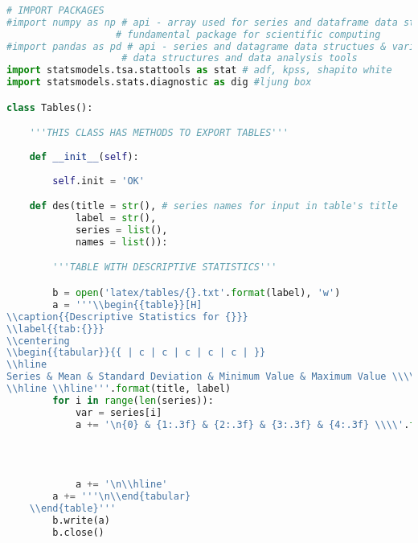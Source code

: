 \begin{lstlisting}[language=Python]



# IMPORT PACKAGES
#import numpy as np # api - array used for series and dataframe data structures
                   # fundamental package for scientific computing
#import pandas as pd # api - series and datagrame data structues & various 
                    # data structures and data analysis tools
import statsmodels.tsa.stattools as stat # adf, kpss, shapito white
import statsmodels.stats.diagnostic as dig #ljung box

class Tables():

    '''THIS CLASS HAS METHODS TO EXPORT TABLES'''
    
    def __init__(self):
        
        self.init = 'OK'

    def des(title = str(), # series names for input in table's title
            label = str(),
            series = list(),
            names = list()):

        '''TABLE WITH DESCRIPTIVE STATISTICS'''

        b = open('latex/tables/{}.txt'.format(label), 'w')
        a = '''\\begin{{table}}[H]
\\caption{{Descriptive Statistics for {}}}
\\label{{tab:{}}}
\\centering
\\begin{{tabular}}{{ | c | c | c | c | c | }}
\\hline
Series & Mean & Standard Deviation & Minimum Value & Maximum Value \\\\
\\hline \\hline'''.format(title, label)
        for i in range(len(series)):
            var = series[i]
            a += '\n{0} & {1:.3f} & {2:.3f} & {3:.3f} & {4:.3f} \\\\'.format(names[i],
                                                                             var.mean(),
                                                                             var.std(),
                                                                             var.min(),
                                                                             var.max())
            a += '\n\\hline'
        a += '''\n\\end{tabular}
    \\end{table}'''
        b.write(a)
        b.close()


\end{lstlisting}
